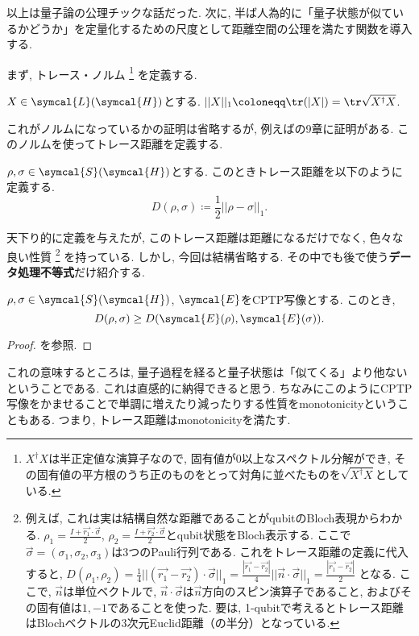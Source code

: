 

以上は量子論の公理チックな話だった. 
次に, 半ば人為的に「量子状態が似ているかどうか」を定量化するための尺度として距離空間の公理を満たす関数を導入する. 

まず, トレース・ノルム
\footnote{$X^{\dag}X$は半正定値な演算子なので, 固有値が0以上なスペクトル分解ができ, その固有値の平方根のうち正のものをとって対角に並べたものを$\sqrt{X^\dag X}$としている. }
を定義する. 
\begin{mydfn}\label{dfn.trace_norm}
$X\in\symcal{L}(\symcal{H})$とする. 
$||X||_1\coloneqq \tr (|X|)=\tr\sqrt{X^\dag X}$. 
\end{mydfn}
これがノルムになっているかの証明は省略するが, 例えば\cite{nielsen2010quantum}の9章に証明がある. 
このノルムを使ってトレース距離を定義する. 

\begin{mydfn}[トレース距離]
  $\rho, \sigma\in\symcal{S}(\symcal{H})$とする. 
  このときトレース距離を以下のように定義する. 
  \begin{equation}
    D(\rho, \sigma)\coloneqq \frac{1}{2}||\rho-\sigma||_1. 
  \end{equation}
\end{mydfn}

天下り的に定義を与えたが, このトレース距離は距離になるだけでなく, 色々な良い性質
\footnote{例えば, これは実は結構自然な距離であることがqubitのBloch表現からわかる. 
$\rho_1=\frac{I+\vec{r_1}\cdot\vec{\sigma}}{2}$, $\rho_2=\frac{I+\vec{r_2}\cdot\vec{\sigma}}{2}$とqubit状態をBloch表示する. 
ここで$\vec{\sigma}=(\sigma_1,\sigma_2,\sigma_3)$は3つのPauli行列である. 
これをトレース距離の定義に代入すると, 
$D(\rho_1,\rho_2)=\frac{1}{4}||(\vec{r_1}-\vec{r_2})\cdot\vec{\sigma}||_1=\frac{|\vec{r_1}-\vec{r_2}|}{4}||\vec{n}\cdot\vec{\sigma}||_1=\frac{|\vec{r_1}-\vec{r_2}|}{2}$
となる. 
ここで, $\vec{n}$は単位ベクトルで, $\vec{n}\cdot\vec{\sigma}$は$\vec{n}$方向のスピン演算子であること, およびその固有値は$1, -1$であることを使った. 
要は, 1-qubitで考えるとトレース距離はBlochベクトルの3次元Euclid距離（の半分）となっている. }
を持っている. 
しかし, 今回は結構省略する. 
その中でも後で使う\textbf{データ処理不等式}だけ紹介する. 
\begin{mythm}[データ処理不等式]\label{thm.data-processing_inequality}
  $\rho, \sigma\in\symcal{S}(\symcal{H})$, $\symcal{E}$をCPTP写像とする. 
  このとき, 
  \begin{equation}
    D(\rho, \sigma)\geq D(\symcal{E}(\rho), \symcal{E}(\sigma)). 
  \end{equation}
\end{mythm}

\begin{proof}
  \cite{nielsen2010quantum}を参照. 
\end{proof}

これの意味するところは, 量子過程を経ると量子状態は「似てくる」より他ないということである. 
これは直感的に納得できると思う. 
ちなみにこのようにCPTP写像をかませることで単調に増えたり減ったりする性質をmonotonicityということもある. 
つまり, トレース距離はmonotonicityを満たす. 


